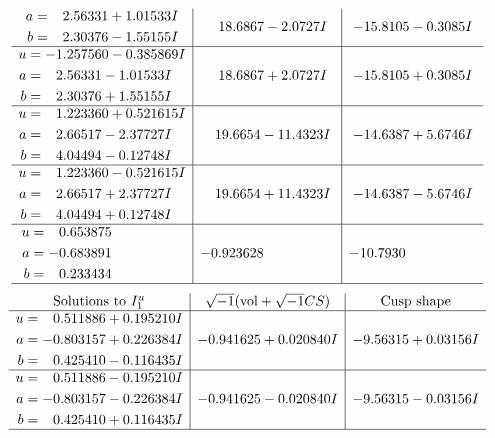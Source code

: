 \documentclass[1p]{elsarticle_modified}
\theoremstyle{definition}
\newcommand{\I}{\sqrt{-1}}
\begin{document}
$$\begin{array}{c|c|c}
\begin{aligned}
a &= \phantom{-}2.56331 + 1.01533 I \\
b &= \phantom{-}2.30376 - 1.55155 I\end{aligned}
 & \phantom{-}18.6867 - 2.0727 I & -15.8105 - 0.3085 I \\ \hline\begin{aligned}
u &= -1.257560 - 0.385869 I \\
a &= \phantom{-}2.56331 - 1.01533 I \\
b &= \phantom{-}2.30376 + 1.55155 I\end{aligned}
 & \phantom{-}18.6867 + 2.0727 I & -15.8105 + 0.3085 I \\ \hline\begin{aligned}
u &= \phantom{-}1.223360 + 0.521615 I \\
a &= \phantom{-}2.66517 - 2.37727 I \\
b &= \phantom{-}4.04494 - 0.12748 I\end{aligned}
 & \phantom{-}19.6654 - 11.4323 I & -14.6387 + 5.6746 I \\ \hline\begin{aligned}
u &= \phantom{-}1.223360 - 0.521615 I \\
a &= \phantom{-}2.66517 + 2.37727 I \\
b &= \phantom{-}4.04494 + 0.12748 I\end{aligned}
 & \phantom{-}19.6654 + 11.4323 I & -14.6387 - 5.6746 I \\ \hline\begin{aligned}
u &= \phantom{-}0.653875\phantom{ +0.000000I} \\
a &= -0.683891\phantom{ +0.000000I} \\
b &= \phantom{-}0.233434\phantom{ +0.000000I}\end{aligned}
 & -0.923628\phantom{ +0.000000I} & -10.7930\phantom{ +0.000000I}\\
 \hline 
 \end{array}$$\newpage$$\begin{array}{c|c|c}  
\text{Solutions to }I^u_{1}& \I (\text{vol} + \sqrt{-1}CS) & \text{Cusp shape}\\
 \hline 
\begin{aligned}
u &= \phantom{-}0.511886 + 0.195210 I \\
a &= -0.803157 + 0.226384 I \\
b &= \phantom{-}0.425410 - 0.116435 I\end{aligned}
 & -0.941625 + 0.020840 I & -9.56315 + 0.03156 I \\ \hline\begin{aligned}
u &= \phantom{-}0.511886 - 0.195210 I \\
a &= -0.803157 - 0.226384 I \\
b &= \phantom{-}0.425410 + 0.116435 I\end{aligned}
 & -0.941625 - 0.020840 I & -9.56315 - 0.03156 I\\
 \hline 
 \end{array}$$\newpage\newpage\renewcommand{\arraystretch}{1}
\end{document}
